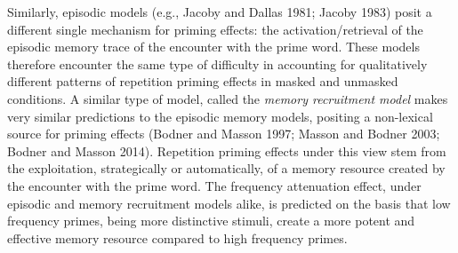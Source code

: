 \documentclass[
]{interact}
\begin{document}
Similarly, episodic models (e.g., Jacoby and Dallas 1981; Jacoby 1983)
posit a different single mechanism for priming effects: the
activation/retrieval of the episodic memory trace of the encounter with
the prime word. These models therefore encounter the same type of
difficulty in accounting for qualitatively different patterns of
repetition priming effects in masked and unmasked conditions. A similar
type of model, called the \emph{memory recruitment model} makes very
similar predictions to the episodic memory models, positing a
non-lexical source for priming effects (Bodner and Masson 1997; Masson
and Bodner 2003; Bodner and Masson 2014). Repetition priming effects
under this view stem from the exploitation, strategically or
automatically, of a memory resource created by the encounter with the
prime word. The frequency attenuation effect, under episodic and memory
recruitment models alike, is predicted on the basis that low frequency
primes, being more distinctive stimuli, create a more potent and
effective memory resource compared to high frequency primes.
\end{document}

